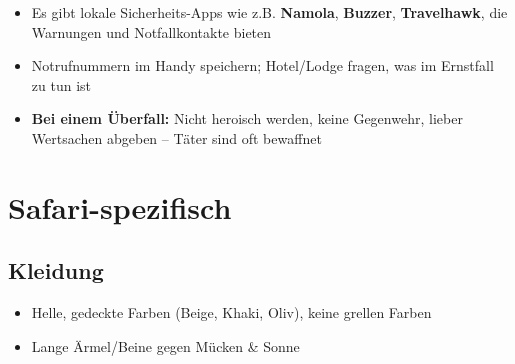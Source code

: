 \documentclass[12pt,a4paper]{article}
\begin{document}
\begin{purplebox}
\begin{itemize}[leftmargin=*,label={\color{deeppurple}\faMobileAlt}]
    \item Es gibt lokale Sicherheits-Apps wie z.B. \textbf{Namola}, \textbf{Buzzer}, \textbf{Travelhawk}, die Warnungen und Notfallkontakte bieten
    \item Notrufnummern im Handy speichern; Hotel/Lodge fragen, was im Ernstfall zu tun ist
    \item \textbf{Bei einem Überfall:} Nicht heroisch werden, keine Gegenwehr, lieber Wertsachen abgeben – Täter sind oft bewaffnet\cite{southafrica-diplo-1}
\end{itemize}
\end{purplebox}

\newpage
\section{Safari-spezifisch}

\begin{center}
\end{center}

\vspace{0.5cm}

\subsection{Kleidung}

\begin{itemize}[leftmargin=*,label={\color{accentorange}\faTshirt}]
    \item Helle, gedeckte Farben (Beige, Khaki, Oliv), keine grellen Farben
    \item Lange Ärmel/Beine gegen Mücken \& Sonne
\end{itemize}
\end{document}
